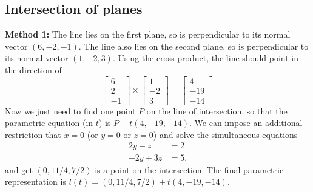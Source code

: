 \subsection{Intersection of planes}
\textbf{Method 1:} The line lies on the first plane, so is perpendicular to its normal vector $(6,-2,-1)$. The line also lies on the second plane, so is perpendicular to its normal vector $(1,-2,3)$. Using the cross product, the line should point in the direction of \[
\begin{bmatrix}
	6\\2\\-1
\end{bmatrix} \times\begin{bmatrix}
1\\-2\\3
\end{bmatrix}=\begin{bmatrix}
4\\-19 \\ -14
\end{bmatrix}
\]
Now we just need to find one point $P$ on the line of intersection, so that the parametric equation (in $t$) is $P+t(4,-19,-14)$.
We can impose an additional restriction that $x=0$ (or $y=0$ or $z=0$) and solve the simultaneous equations\begin{align*}
	2y-z&=2\\
	-2y+3z&=5.
\end{align*}
and get $(0,11/4,7/2)$ is a point on the intersection. The final parametric representation is $l(t)=(0,11/4,7/2)+t(4,-19,-14)$.


